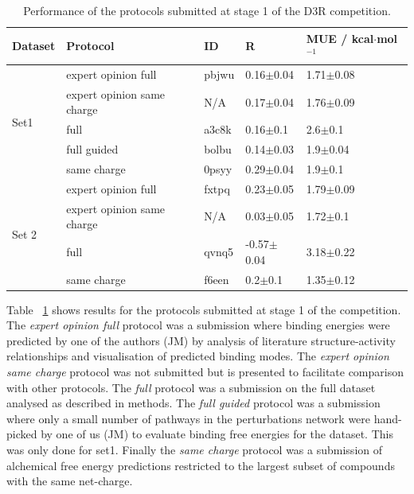 \documentclass{svjour3}                     %
\begin{document}
\begin{table}[]
\centering
\begin{tabular}{|l|l|l|l|l|}
\hline
Dataset            & Protocol & ID & R & MUE / kcal$\cdot$mol$^{-1}$ \\ \hline
\multirow{5}{*}{Set1} & expert opinion full        & pbjwu             & 0.16$\pm$0.04 & 1.71$\pm$0.08   \\ \cline{2-5} 
                      & expert opinion same charge        & N/A             & 0.17$\pm$0.04 & 1.76$\pm$0.09   \\ \cline{2-5} 
                   & full      & a3c8k              & 0.16$\pm$0.1 & 2.6$\pm$0.1   \\ \cline{2-5} 
                   &full guided        & bolbu              & 0.14$\pm$0.03 & 1.9$\pm$0.04   \\ \cline{2-5} 
                   & same charge        & 0psyy              & 0.29$\pm$0.04 & 1.9$\pm$0.1   \\ \hline
\multirow{4}{*}{Set 2} & expert opinion full       & fxtpq              & 0.23$\pm$0.05 & 1.79$\pm$0.09   \\ \cline{2-5} 
                   & expert opinion same charge        & N/A             & 0.03$\pm$0.05 & 1.72$\pm$0.1   \\ \cline{2-5} 
                   & full        & qvnq5              & -0.57$\pm$0.04 & 3.18$\pm$0.22   \\ \cline{2-5} 
                   & same charge        & f6een              & 0.2$\pm$0.1 & 1.35$\pm$0.12   \\ \hline
\end{tabular}
\caption{Performance of the protocols submitted at stage 1 of the D3R competition.}
\label{tab:stage1}
\end{table}

Table ~\ref{tab:stage1} shows results for the protocols submitted at stage 1 of the competition. The \textit{expert opinion full} protocol was a submission where binding energies were predicted by one of the authors (JM) by analysis of literature structure-activity relationships and visualisation of predicted binding modes. The \textit{expert opinion same charge} protocol was not submitted but is presented to facilitate comparison with other protocols. The \textit{full} protocol was a submission on the full dataset analysed as described in methods. The \textit{full guided} protocol was a submission where only a small number of pathways in the perturbations network were hand-picked by one of us (JM) to evaluate binding free energies for the dataset. This was only done for set1. Finally the \textit{same charge} protocol was a submission of alchemical free energy predictions restricted to the largest subset of compounds with the same net-charge.   
\end{document}
